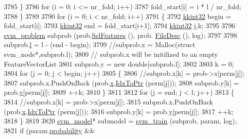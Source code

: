 \begin{DoxyCode}
3785     \}
3786     \textcolor{keywordflow}{for}  (i = 0;  i <=  nr\_fold; i++)
3787       fold\_start[i] = i * l / nr\_fold;
3788   \}
3789 
3790   \textcolor{keywordflow}{for}  (i = 0;  i < nr\_fold;  i++)
3791   \{
3792     \hyperlink{namespace_k_k_b_a8fa4952cc84fda1de4bec1fbdd8d5b1b}{kkint32} begin = fold\_start[i];
3793     \hyperlink{namespace_k_k_b_a8fa4952cc84fda1de4bec1fbdd8d5b1b}{kkint32} end = fold\_start[i+1];
3794     \hyperlink{namespace_k_k_b_a8fa4952cc84fda1de4bec1fbdd8d5b1b}{kkint32} j,k;
3795 
3796     \hyperlink{struct_s_v_m289___b_f_s_1_1svm__problem}{svm\_problem}  subprob (prob.\hyperlink{struct_s_v_m289___b_f_s_1_1svm__problem_a3127cc3a9a6352218c227051f2608caa}{SelFeatures} (), prob.
      \hyperlink{struct_s_v_m289___b_f_s_1_1svm__problem_a0b0e37f9bfd7753f691070fdcd05569f}{FileDesc} (), log);
3797 
3798     subprob.\hyperlink{struct_s_v_m289___b_f_s_1_1svm__problem_afd75fe2ff65aa0c0f27b85b04028b2f3}{l} = l - (end - begin);
3799     \textcolor{comment}{//subprob.x = Malloc(struct svm\_node*,subprob.l);}
3800     \textcolor{comment}{// subprob.x  will be initilized to an empty FeatureVectorList }
3801     subprob.y = \textcolor{keyword}{new} \textcolor{keywordtype}{double}[subprob.l];
3802       
3803     k = 0;
3804     \textcolor{keywordflow}{for}  (j = 0;  j < begin;  j++)
3805     \{
3806       \textcolor{comment}{//subprob.x[k] = prob->x[perm[j]];}
3807       subprob.x.PushOnBack (prob.\hyperlink{struct_s_v_m289___b_f_s_1_1svm__problem_a41858dbcf26913311ad17674d9eb42a8}{x}.\hyperlink{class_k_k_b_1_1_k_k_queue_acce2bdd8b3327e38266cf198382cd852}{IdxToPtr} (perm[j]));
3808       subprob.y[k] = prob.\hyperlink{struct_s_v_m289___b_f_s_1_1svm__problem_a6a79c81e0e6251913062a811c87d9325}{y}[perm[j]];
3809       ++k;
3810     \}
3811 
3812     \textcolor{keywordflow}{for}  (j = end;  j < l;  j++)
3813     \{
3814       \textcolor{comment}{//subprob.x[k] = prob->x[perm[j]];}
3815       subprob.x.PushOnBack (prob.\hyperlink{struct_s_v_m289___b_f_s_1_1svm__problem_a41858dbcf26913311ad17674d9eb42a8}{x}.\hyperlink{class_k_k_b_1_1_k_k_queue_acce2bdd8b3327e38266cf198382cd852}{IdxToPtr} (perm[j]));
3816       subprob.y[k] = prob.\hyperlink{struct_s_v_m289___b_f_s_1_1svm__problem_a6a79c81e0e6251913062a811c87d9325}{y}[perm[j]];
3817       ++k;
3818     \}
3819 
3820     \hyperlink{struct_s_v_m289___b_f_s_1_1svm__model}{svm\_model}*  submodel = \hyperlink{namespace_s_v_m233_a0f6331f1d29cc73bc32f39c104b8d74c}{svm\_train} (subprob, param, log);
3821     \textcolor{keywordflow}{if}  (param.\hyperlink{struct_s_v_m289___b_f_s_1_1svm__parameter_acfe1c2e7915f38fd2c82cbf7403f6428}{probability} && 

\end{DoxyCode}
